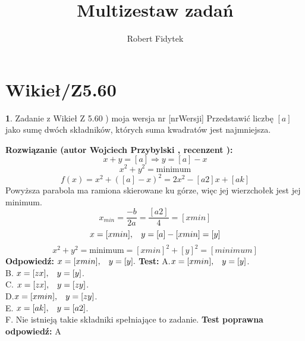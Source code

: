 \documentclass[12pt, a4paper]{article}
\title{Multizestaw zadań}
\author{Robert Fidytek}
\date{}
\theoremstyle{definition} %
\newtheorem{zad}{}
\newcommand{\kategoria}[1]{\section{#1}} %
\newcommand{\zadStart}[1]{\begin{zad}#1\newline} %
\newcommand{\zadStop}{\end{zad}}   %
\newcommand{\rozwStart}[2]{\noindent \textbf{Rozwiązanie (autor #1 , recenzent #2): }\newline} %
\newcommand{\rozwStop}{\newline}                                            %
\newcommand{\odpStart}{\noindent \textbf{Odpowiedź:}\newline}    %
\newcommand{\odpStop}{\newline}                                             %
\newcommand{\testStart}{\noindent \textbf{Test:}\newline} %
\newcommand{\testStop}{\newline} %
\newcommand{\kluczStart}{\noindent \textbf{Test poprawna odpowiedź:}\newline} %
\newcommand{\kluczStop}{\newline} %
\begin{document}
\maketitle


\kategoria{Wikieł/Z5.60}
\zadStart{Zadanie z Wikieł Z 5.60 ) moja wersja nr [nrWersji]}
Przedstawić liczbę $[a]$ jako sumę dwóch składników, których suma kwadratów jest najmniejsza.
\zadStop
\rozwStart{Wojciech Przybylski}{}
$$x+y=[a] \Rightarrow y=[a]-x$$
$$x^{2}+y^{2}=\mbox{minimum}$$
$$f(x)=x^{2}+([a]-x)^{2}=2x^{2}-[a2]x+[ak]$$
Powyższa parabola ma ramiona skierowane ku górze, więc jej wierzchołek jest jej minimum.
$$x_{min}=\frac{-b}{2a}=\frac{[a2]}{4}=[xmin]$$
$$x=[xmin], \hspace{3mm} y=[a]-[xmin]=[y]$$
$$x^{2}+y^{2}=\mbox{minimum}=[xmin]^{2}+[y]^{2}=[minimum]$$
\rozwStop
\odpStart
$x=[xmin], \hspace{3mm} y=[y].$
\odpStop
\testStart
A.$x=[xmin], \hspace{3mm} y=[y]$.\\
B. $x=[zx], \hspace{3mm} y=[y]$.\\
C. $x=[zx], \hspace{3mm} y=[zy]$.\\
D.$x=[xmin], \hspace{3mm} y=[zy]$.\\
E. $x=[ak], \hspace{3mm} y=[a2]$.\\
F. Nie istnieją takie składniki spełniające to zadanie.
\testStop
\kluczStart
A
\kluczStop
\end{document}
